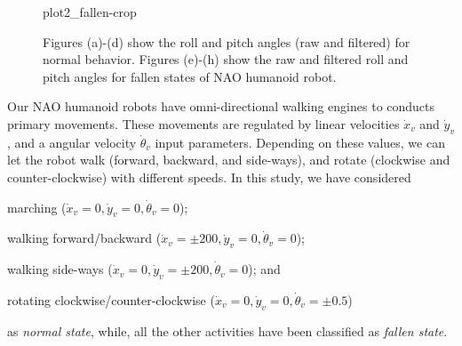 \documentclass[letterpaper]{article}
\begin{document}
\begin{figure}[!ht]
{       {plot2_fallen-crop}}
  \caption{Figures (a)-(d) show the roll and pitch angles (raw and filtered) for normal 
behavior. Figures (e)-(h) show the raw and filtered roll and pitch angles for fallen 
states of NAO humanoid robot.}
  \label{fig:normalFallenBehavior}

\end{figure}

Our NAO humanoid robots have omni-directional walking engines to conducts primary  
movements. These movements are regulated by linear velocities $\dot{x}_v$ and $\dot{y}_v$, and a 
angular velocity $\dot{\theta}_v$ input parameters. Depending on these
values, we can let the robot walk (forward, backward, and side-ways), and rotate (clockwise and
counter-clockwise) with different speeds. In this study, we have considered \begin{inparaenum}[(1)]
\item marching ($\dot{x}_v = 0 , \dot{y}_v = 0, \dot{\theta}_v = 0$); \item walking  
forward/backward ($\dot{x}_v = \pm200
, \dot{y}_v = 0, \dot{\theta}_v = 0$);  \item walking side-ways ($\dot{x}_v = 0, \dot{y}_v = 
\pm200, \dot{\theta}_v = 0$); and  \item rotating clockwise/counter-clockwise
($\dot{x}_v = 0 , \dot{y}_v = 0, \dot{\theta}_v = \pm 0.5$) \end{inparaenum} as {\em normal state}, 
while, all the other activities have been classified as {\em fallen state}. 
\end{document}
